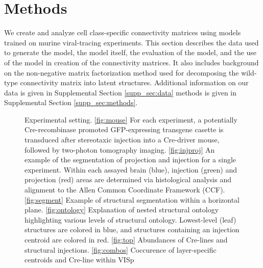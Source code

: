 \section{Methods}
\label{sec:methods}

We create and analyze cell class-specific connectivity matrices using models trained on murine viral-tracing experiments.
This section describes the data used to generate the model, the model itself, the evaluation of the model, and the use of the model in creation of the connectivity matrices.
It also includes background on the non-negative matrix factorization method used for decomposing the wild-type connectivity matrix into latent structures.
Additional information on our data is given in Supplemental Section \ref{supp_sec:data} methods is given in Supplemental Section \ref{supp_sec:methods}.

\newpage
\begin{figure}[H]
    \newline
    \caption{Experimental setting.  \ref{fig:mouse}  For each experiment, a potentially Cre-recombinase promoted GFP-expressing transgene casette is transduced after stereotaxic injection into a Cre-driver mouse, followed by two-photon tomography imaging. \ref{fig:injproj} An example of the segmentation of projection and injection for a single experiment. Within each assayed brain (blue), injection (green) and projection (red) areas are determined via histological analysis and alignment to the Allen Common Coordinate Framework (CCF).   \ref{fig:segment} Example of structural segmentation within a horizontal plane. \ref{fig:ontology} Explanation of nested structural ontology highlighting various levels of structural ontology.  Lowest-level (leaf) structures are colored in blue, and structures containing an injection centroid are colored in red. \ref{fig:top}  Abundances of Cre-lines and structural injections. \ref{fig:combos}  Coccurence of layer-specific centroids and Cre-line within VISp}
    \label{fig:data}
\end{figure}

